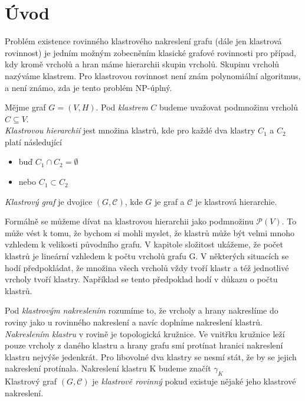 \chapter{Úvod}
Problém existence rovinného klastrového nakreslení grafu (dále jen klastrová rovinnost) je jedním možným zobecněním klasické grafové rovinnosti pro případ, kdy kromě vrcholů a hran máme hierarchii skupin vrcholů. Skupinu vrcholů nazýváme klastrem. Pro klastrovou rovinnost není znám polynomiální algoritmus, a není známo, zda je tento problém NP-úplný. 

\begin{defn}
Mějme graf $G=(V,H)$. Pod \textit{klastrem} $C$ budeme uvažovat podmnožinu vrcholů  $C \subseteq V$. \\
\textit{Klastrovou hierarchií} jest množina klastrů, kde pro každé dva klastry $C_1$ a $C_2$ platí následující
\begin{itemize}
\item buď $C_1 \cap C_2 = \emptyset$
\item nebo $C_1 \subset C_2$
\end{itemize}
\textit{Klastrový graf} je dvojice $(G,\mathcal C)$, kde $G$ je graf a $\mathcal C$ je klastrová hierarchie.
\end{defn}

Formálně se můžeme dívat na klastrovou hierarchii jako podmnožinu $\mathcal P (V)$. To může vést k tomu, že bychom si mohli myslet, že klastrů může být velmi mnoho vzhledem k velikosti původního grafu. V kapitole složitost ukážeme, že počet klastrů je lineární vzhledem k počtu vrcholů grafu G. V některých situacích se hodí předpokládat, že množina všech vrcholů vždy tvoří klastr a též jednotlivé vrcholy tvoří klastry. Například se tento předpoklad  hodí v důkazu o počtu klastrů.

\begin{defn}
Pod \textit{klastrovým nakreslením} rozumíme to, že vrcholy a hrany nakreslíme do roviny jako u rovinného nakreslení a navíc doplníme nakreslení klastrů.\\ \textit{Nakreslením klastru} v rovině je topologická kružnice. Ve vnitřku kružnice leží pouze vrcholy z daného klastru a hrany grafu smí protínat hranici nakreslení klastru nejvýše jedenkrát. Pro libovolné dva klastry se nesmí stát, že by se jejich nakreslení protínala. Nakreslení klastru K budeme značít $\gamma_K$ \\
Klastrový graf $(G,\mathcal C)$ je \textit{klastrově rovinný} pokud existuje nějaké jeho klastrové nakreslení.
\end{defn}

